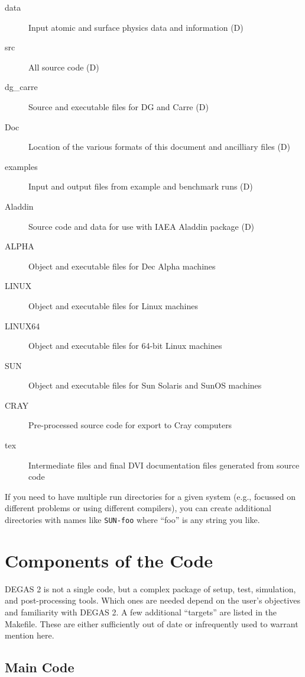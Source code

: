 \documentclass[12pt]{report}
\begin{document}
\begin{description}
\item[data] Input atomic and surface physics data and information (D)
\item[src] All source code (D)
\item[dg\_carre] Source and executable files for DG and Carre (D)
\item[Doc] Location of the various formats of this document and ancilliary
files (D)
\item[examples] Input and output files from example and benchmark runs (D)
\item[Aladdin] Source code and data for use with IAEA Aladdin package (D)
\item[ALPHA] Object and executable files for Dec Alpha machines
\item[LINUX] Object and executable files for Linux machines
\item[LINUX64] Object and executable files for 64-bit Linux machines
\item[SUN] Object and executable files for Sun Solaris and SunOS machines
\item[CRAY] Pre-processed source code for export to Cray computers
\item[tex] Intermediate files and final DVI documentation files generated 
from source code
\end{description}

If you need to have multiple run directories for a given system (e.g., focussed
on different problems or using different compilers), you can create additional
directories with names like \verb+SUN-foo+ where ``foo'' is any string you like.

\section{Components of the Code}
\label{components}

DEGAS 2 is not a single code, but a complex package of 
setup, test, simulation, and post-processing tools. Which ones are
needed depend on the user's objectives and familiarity with DEGAS 2.
A few additional ``targets'' are listed in the Makefile. These are
either sufficiently out of date or infrequently used to warrant
mention here.

\subsection{Main Code}
\label{maincode}
\end{document}
